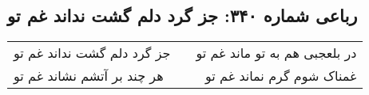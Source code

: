 \begin{center}
\section*{رباعی شماره ۳۴۰: جز گرد دلم گشت نداند غم تو}
\label{sec:sh340}
\begin{longtable}{l p{0.5cm} r}
جز گرد دلم گشت نداند غم تو
&&
در بلعجبی هم به تو ماند غم تو
\\
هر چند بر آتشم نشاند غم تو
&&
غمناک شوم گرم نماند غم تو
\\
\end{longtable}
\end{center}
